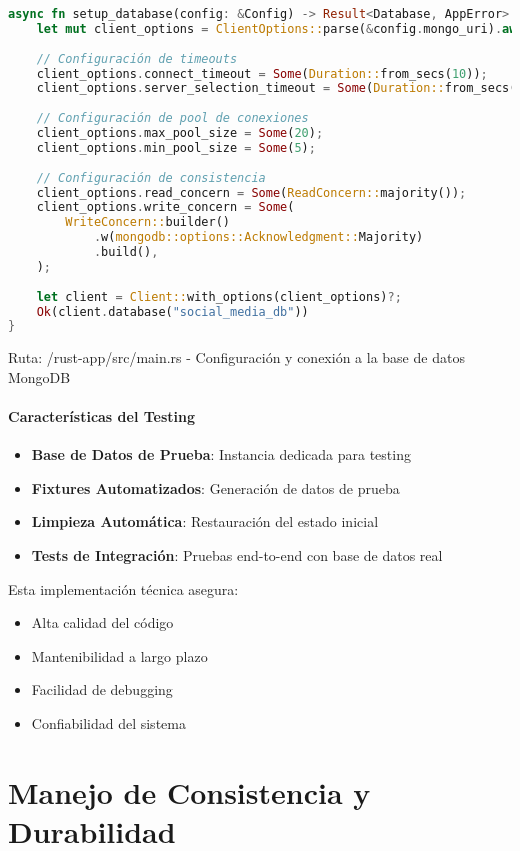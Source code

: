 \documentclass[12pt,letterpaper]{article}
\begin{document}
\begin{lstlisting}[language=rust]
async fn setup_database(config: &Config) -> Result<Database, AppError> {
    let mut client_options = ClientOptions::parse(&config.mongo_uri).await?;
    
    // Configuración de timeouts
    client_options.connect_timeout = Some(Duration::from_secs(10));
    client_options.server_selection_timeout = Some(Duration::from_secs(15));
    
    // Configuración de pool de conexiones
    client_options.max_pool_size = Some(20);
    client_options.min_pool_size = Some(5);
    
    // Configuración de consistencia
    client_options.read_concern = Some(ReadConcern::majority());
    client_options.write_concern = Some(
        WriteConcern::builder()
            .w(mongodb::options::Acknowledgment::Majority)
            .build(),
    );
    
    let client = Client::with_options(client_options)?;
    Ok(client.database("social_media_db"))
}
\end{lstlisting}
\small{Ruta: /rust-app/src/main.rs - Configuración y conexión a la base de datos MongoDB}

\paragraph{Características del Testing}
\begin{itemize}
    \item \textbf{Base de Datos de Prueba}: Instancia dedicada para testing
    \item \textbf{Fixtures Automatizados}: Generación de datos de prueba
    \item \textbf{Limpieza Automática}: Restauración del estado inicial
    \item \textbf{Tests de Integración}: Pruebas end-to-end con base de datos real
\end{itemize}

Esta implementación técnica asegura:
\begin{itemize}
    \item Alta calidad del código
    \item Mantenibilidad a largo plazo
    \item Facilidad de debugging
    \item Confiabilidad del sistema
\end{itemize}
\section{Manejo de Consistencia y Durabilidad}
\end{document}
